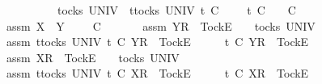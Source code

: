 \ \ \ \ \ \ \ \ {\isasymrho}\ {\isasymin}\ tocks\ UNIV\ {\isasymLongrightarrow}\ {\isasymforall}t{\isasymin}tocks\ UNIV{\isachardot}\ t\ {\isasymle}\isactrlsub C\ {\isasymrho}\ {\isacharat}\ {\isasymsigma}{\isacharprime}\ {\isasymlongrightarrow}\ t\ {\isasymle}\isactrlsub C\ {\isasymrho}\ {\isasymLongrightarrow}\ {\isasymrho}\ {\isasymlesssim}\isactrlsub C\ {\isasymsigma}{\isacharprime}{\isacharprime}{\isacharparenright}{\isachardoublequoteclose}\isanewline
\ \ \isamarkupfalse%
\ assm{}{\isacharcolon}\ {\isachardoublequoteopen}X\ {\isasymsubseteq}\ Y\ {\isasymand}\ {\isasymrho}\ {\isacharat}\ {\isasymsigma}{\isacharprime}\ {\isasymlesssim}\isactrlsub C\ {\isasymsigma}{\isacharprime}{\isacharprime}\ {\isacharat}\ {\isasymsigma}{\isachardoublequoteclose}\isanewline
\ \ \isamarkupfalse%
\ assm{}{\isacharcolon}\ {\isachardoublequoteopen}{\isacharbrackleft}Y{\isacharbrackright}\isactrlsub R\ {\isacharhash}\ {\isacharbrackleft}Tock{\isacharbrackright}\isactrlsub E\ {\isacharhash}\ {\isasymsigma}{\isacharprime}{\isacharprime}\ {\isasymin}\ tocks\ UNIV{\isachardoublequoteclose}\isanewline
\ \ \isamarkupfalse%
\ assm{}{\isacharcolon}\ {\isachardoublequoteopen}{\isasymforall}t{\isasymin}tocks\ UNIV{\isachardot}\ t\ {\isasymle}\isactrlsub C\ {\isacharbrackleft}Y{\isacharbrackright}\isactrlsub R\ {\isacharhash}\ {\isacharbrackleft}Tock{\isacharbrackright}\isactrlsub E\ {\isacharhash}\ {\isasymsigma}{\isacharprime}{\isacharprime}\ {\isacharat}\ {\isasymsigma}\ {\isasymlongrightarrow}\ t\ {\isasymle}\isactrlsub C\ {\isacharbrackleft}Y{\isacharbrackright}\isactrlsub R\ {\isacharhash}\ {\isacharbrackleft}Tock{\isacharbrackright}\isactrlsub E\ {\isacharhash}\ {\isasymsigma}{\isacharprime}{\isacharprime}{\isachardoublequoteclose}\isanewline
\ \ \isamarkupfalse%
\ assm{}{\isacharcolon}\ {\isachardoublequoteopen}{\isacharbrackleft}X{\isacharbrackright}\isactrlsub R\ {\isacharhash}\ {\isacharbrackleft}Tock{\isacharbrackright}\isactrlsub E\ {\isacharhash}\ {\isasymrho}\ {\isasymin}\ tocks\ UNIV{\isachardoublequoteclose}\isanewline
\ \ \isamarkupfalse%
\ assm{}{\isacharcolon}\ {\isachardoublequoteopen}{\isasymforall}t{\isasymin}tocks\ UNIV{\isachardot}\ t\ {\isasymle}\isactrlsub C\ {\isacharbrackleft}X{\isacharbrackright}\isactrlsub R\ {\isacharhash}\ {\isacharbrackleft}Tock{\isacharbrackright}\isactrlsub E\ {\isacharhash}\ {\isasymrho}\ {\isacharat}\ {\isasymsigma}{\isacharprime}\ {\isasymlongrightarrow}\ t\ {\isasymle}\isactrlsub C\ {\isacharbrackleft}X{\isacharbrackright}\isactrlsub R\ {\isacharhash}\ {\isacharbrackleft}Tock{\isacharbrackright}\isactrlsub E\ {\isacharhash}\ {\isasymrho}{\isachardoublequoteclose}\isanewline
